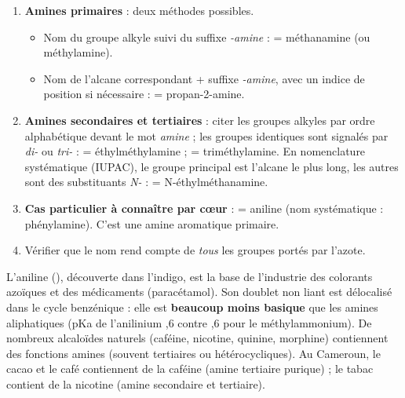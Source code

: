 \documentclass[11pt]{article}
\newcommand{\cle}[1]{{\popxbold\color{popdark}#1}}
\newcounter{popsec}
\newcounter{popsub}
\newcommand{\courssub}[1]{%
  \stepcounter{popsub}%
  \par\vspace{9pt}\noindent{\popxbold\fontsize{11.5}{13}\selectfont\color{popink}{\color{poporange}\thepopsec.\thepopsub}\hspace{6pt}#1}\par\nopagebreak\vspace{4pt}
}
\begin{document}
\courssub{Nomenclature des amines}

\begin{methode}
\begin{enumerate}
\item \textbf{Amines primaires}  : deux méthodes possibles.
\begin{itemize}
\item Nom du groupe alkyle suivi du suffixe \emph{-amine} :  = méthanamine (ou méthylamine).
\item Nom de l'alcane correspondant + suffixe \emph{-amine}, avec un indice de position si nécessaire :  = propan-2-amine.
\end{itemize}
\item \textbf{Amines secondaires et tertiaires} : citer les groupes alkyles par ordre alphabétique devant le mot \emph{amine} ; les groupes identiques sont signalés par \emph{di-} ou \emph{tri-} :  = éthylméthylamine ;  = triméthylamine. En nomenclature systématique (IUPAC), le groupe principal est l'alcane le plus long, les autres sont des substituants \emph{N-} :  = N-éthylméthanamine.
\item \textbf{Cas particulier à connaître par c\oe ur} :  = \cle{aniline} (nom systématique : phénylamine). C'est une amine aromatique primaire.
\item Vérifier que le nom rend compte de \emph{tous} les groupes portés par l'azote.
\end{enumerate}
\end{methode}

\begin{savaistu}
L'aniline (), découverte dans l'indigo, est la base de l'industrie des colorants azoïques et des médicaments (paracétamol). Son doublet non liant est délocalisé dans le cycle benzénique : elle est \textbf{beaucoup moins basique} que les amines aliphatiques (pKa de l'anilinium ,6 contre ,6 pour le méthylammonium).
De nombreux alcaloïdes naturels (caféine, nicotine, quinine, morphine) contiennent des fonctions amines (souvent tertiaires ou hétérocycliques). Au Cameroun, le cacao et le café contiennent de la caféine (amine tertiaire purique) ; le tabac contient de la nicotine (amine secondaire et tertiaire).
\end{savaistu}
\end{document}
